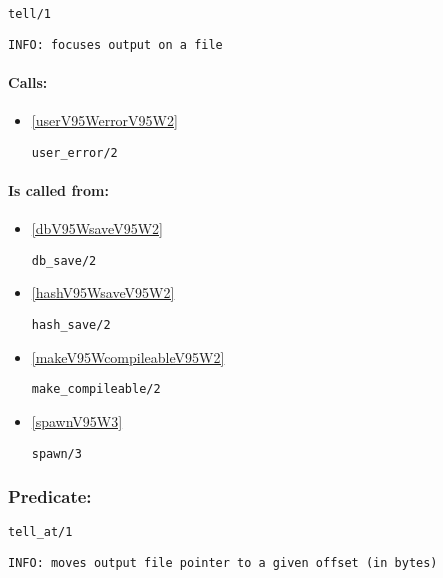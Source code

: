 \begin{verbatim}
tell/1
\end{verbatim}

{\small \begin{verbatim}
INFO: focuses output on a file

\end{verbatim}}
\paragraph{Calls:} 
\begin{itemize}
\item \ref{userV95WerrorV95W2} 
\begin{verbatim}
user_error/2
\end{verbatim}

\end{itemize}
\paragraph{Is called from:} 
\begin{itemize}
\item \ref{dbV95WsaveV95W2} 
\begin{verbatim}
db_save/2
\end{verbatim}

\item \ref{hashV95WsaveV95W2} 
\begin{verbatim}
hash_save/2
\end{verbatim}

\item \ref{makeV95WcompileableV95W2} 
\begin{verbatim}
make_compileable/2
\end{verbatim}

\item \ref{spawnV95W3} 
\begin{verbatim}
spawn/3
\end{verbatim}

\end{itemize}

\subsubsection{Predicate:} \label{tellV95WatV95W1}

\begin{verbatim}
tell_at/1
\end{verbatim}

{\small \begin{verbatim}
INFO: moves output file pointer to a given offset (in bytes)

\end{verbatim}}
